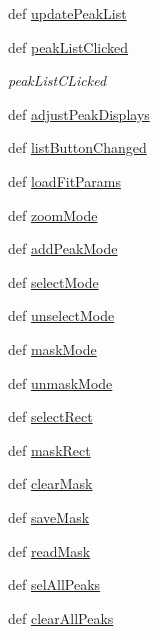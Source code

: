 \begin{DoxyCompactItemize}
\item 
def \hyperlink{class_atrex_1_1_atrex_a88cac9434ce28cbff05cb12b81023d4d}{update\-Peak\-List}
\item 
def \hyperlink{class_atrex_1_1_atrex_a2452575598eb0088e452b2160610da4f}{peak\-List\-Clicked}
\begin{DoxyCompactList}\small\item\em peak\-List\-C\-Licked \end{DoxyCompactList}\item 
def \hyperlink{class_atrex_1_1_atrex_ace2289de8cacf431113b0a06133c5693}{adjust\-Peak\-Displays}
\item 
def \hyperlink{class_atrex_1_1_atrex_a17585a5304b57ea95ad13e6feeebbcde}{list\-Button\-Changed}
\item 
def \hyperlink{class_atrex_1_1_atrex_a245293bfb74e32de50e99de66ffeeb55}{load\-Fit\-Params}
\item 
def \hyperlink{class_atrex_1_1_atrex_a054de9d87526f2849d35862b6747a658}{zoom\-Mode}
\item 
def \hyperlink{class_atrex_1_1_atrex_a0efd15d4cccf12a54b9263d84dca6d42}{add\-Peak\-Mode}
\item 
def \hyperlink{class_atrex_1_1_atrex_a99248a89609473aaf887150c69e087fd}{select\-Mode}
\item 
def \hyperlink{class_atrex_1_1_atrex_a739717834e7626d1ba9a1986430f7cf4}{unselect\-Mode}
\item 
def \hyperlink{class_atrex_1_1_atrex_af107ee890ef60784ad28314a7908c439}{mask\-Mode}
\item 
def \hyperlink{class_atrex_1_1_atrex_a45a6a72900b8977bc8497f0ad2c0314a}{unmask\-Mode}
\item 
def \hyperlink{class_atrex_1_1_atrex_a96817ca44885b91f7d2ba9cbff61ced5}{select\-Rect}
\item 
def \hyperlink{class_atrex_1_1_atrex_a210da0549837b917dbb10bd194704d67}{mask\-Rect}
\item 
def \hyperlink{class_atrex_1_1_atrex_a4dce042d175e3f9593319481166886fd}{clear\-Mask}
\item 
def \hyperlink{class_atrex_1_1_atrex_a9a254e4f37cfc3286bab09e45de45db8}{save\-Mask}
\item 
def \hyperlink{class_atrex_1_1_atrex_a3edba6d33e67d7c8cf3eace6aa7bcb1a}{read\-Mask}
\item 
def \hyperlink{class_atrex_1_1_atrex_ac50dc26f3143315895b9afe212aeaa27}{sel\-All\-Peaks}
\item 
def \hyperlink{class_atrex_1_1_atrex_aaf655985f170b76903e840bae4cae564}{clear\-All\-Peaks}

\end{DoxyCompactItemize}
